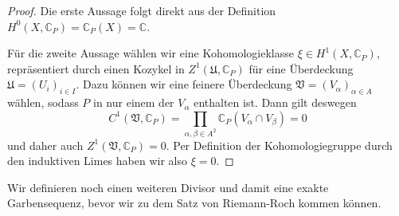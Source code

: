 \documentclass[11pt,a4paper,toc=bibliography]{scrartcl}
\theoremstyle{thm}
\theoremstyle{def}
\theoremstyle{remark}
\begin{document}
\begin{proof}
    Die erste Aussage folgt direkt aus der Definition $H^0(X,\mathbb{C}_P)=\mathbb{C}_P(X)=\mathbb{C}$.
    
    Für die zweite Aussage wählen wir eine Kohomologieklasse $\xi\in H^1(X,\mathbb{C}_P)$, repräsentiert durch einen Kozykel in $Z^1(\mathfrak{U},\mathbb{C}_P)$ für eine Überdeckung $\mathfrak{U}=(U_i)_{i\in I}$. Dazu können wir eine feinere Überdeckung $\mathfrak{V}=(V_{\alpha})_{\alpha\in A}$ wählen, sodass $P$ in nur einem der $V_{\alpha}$ enthalten ist. Dann gilt deswegen
    \[
    C^1(\mathfrak{V},\mathbb{C}_P)=\prod_{\alpha,\beta\in A^2} \mathbb{C}_P(V_{\alpha}\cap V_{\beta})=0
    \]
    und daher auch $Z^1(\mathfrak{V},\mathbb{C}_P)=0$. Per Definition der Kohomologiegruppe durch den induktiven Limes haben wir also $\xi = 0$.
\end{proof}
Wir definieren noch einen weiteren Divisor und damit eine exakte Garbensequenz, bevor wir zu dem Satz von Riemann-Roch kommen können.
\end{document}
